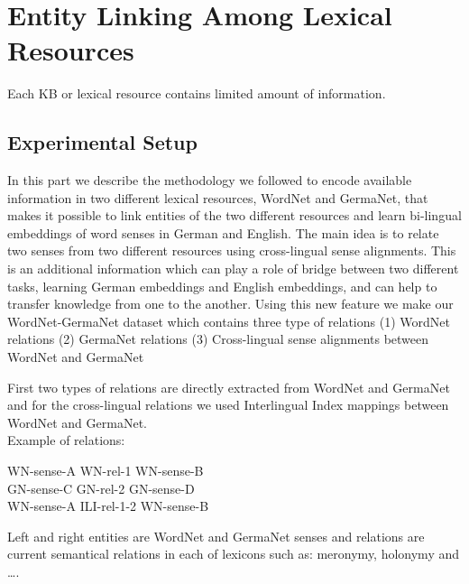 \chapter{Entity Linking Among Lexical Resources}
\label{ch:exp-ent-link}

Each KB or lexical resource contains limited amount of information.  

\section{Experimental Setup}
\label{sec:xkb-exp}

In this part we describe the methodology we followed to encode available information 
in two different lexical resources, WordNet and GermaNet, that makes it possible to link entities of the two different
resources and learn bi-lingual 
embeddings of word senses in German and English.  
The main idea is to relate two senses from two different resources using cross-lingual sense alignments.
This is an additional information which can play a role of bridge between two
different tasks, learning German embeddings and English embeddings, and can help to transfer knowledge from one to the another.
Using this new feature we make our WordNet-GermaNet dataset which contains three type of relations 
(1) WordNet relations 
(2) GermaNet relations
(3) Cross-lingual sense alignments between WordNet and GermaNet

First two types of relations are directly extracted from WordNet and GermaNet and for the 
cross-lingual relations we used Interlingual Index mappings between WordNet and GermaNet.
\\
Example of relations:
\begin{center}
WN-sense-A \hspace{0.3in}  WN-rel-1    \hspace{0.3in}  WN-sense-B\\
GN-sense-C \hspace{0.3in}  GN-rel-2    \hspace{0.3in}  GN-sense-D\\
WN-sense-A \hspace{0.3in}  ILI-rel-1-2 \hspace{0.3in}  WN-sense-B\\
\end{center}

Left and right entities are WordNet and GermaNet senses and relations are current semantical relations in each of lexicons such as:
 meronymy, holonymy and \ldots.
 
